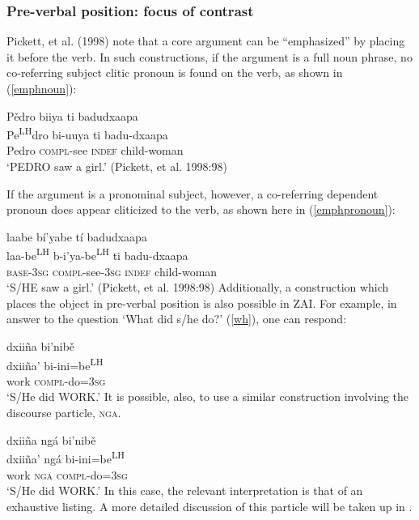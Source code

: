 \z

\subsubsection{Pre-verbal position: focus of contrast}
Pickett, et al. (1998) note that a core argument can be ``emphasized'' by placing it before the verb. In such constructions, if the argument is a full noun phrase, no co-referring subject clitic pronoun is found on the verb, as shown in (\ref{emphnoun}):

\ea\label{emphnoun}
\glll P\v{e}dro biiya ti badudxaapa \\		
Pe\textsuperscript{LH}dro bi-uuya ti badu-dxaapa \\
Pedro \textsc{compl}-see \textsc{indef} child-woman \\
\glt `PEDRO saw a girl.' \hfill (Pickett, et al. 1998:98)

\z
If the argument is a pronominal subject, however, a co-referring dependent pronoun does appear cliticized to the verb, as shown here in (\ref{emphpronoun}):

\ea\label{emphpronoun}
\glll laabe b\'{i}'yabe t\'{i} badudxaapa \\		
laa-be\textsuperscript{LH} b-i'ya-be\textsuperscript{LH} ti badu-dxaapa \\
\textsc{base}-3\textsc{sg} \textsc{compl}-see-3\textsc{sg} \textsc{indef} child-woman \\
\glt `S/HE saw a girl.' \hfill (Pickett, et al. 1998:98)
\z
Additionally, a construction which places the object in pre-verbal position is also possible in ZAI. For example, in answer to the question `What did s/he do?' (\ref{wh}), one can respond:

\ea\label{preverbalobj}
\glll dxiiña bi'nib\v{e} \\
dxiiña' bi-ini=be\textsuperscript{LH} \\
work \textsc{compl}-do=\textsc{3sg} \\
\glt `S/He did WORK.'
\z 
It is possible, also, to use a similar construction involving the discourse particle, \textsc{nga}.  

\ea\label{preverbalnga}
\glll dxiiña ng\'{a} bi'nib\v{e} \\
dxiiña' ng\'{a} bi-ini=be\textsuperscript{LH} \\
work \textsc{nga} \textsc{compl}-do=\textsc{3sg} \\
\glt `S/He did WORK.'
\z 
In this case, the relevant interpretation is that of an exhaustive listing. A more detailed discussion of this particle will be taken up in .

